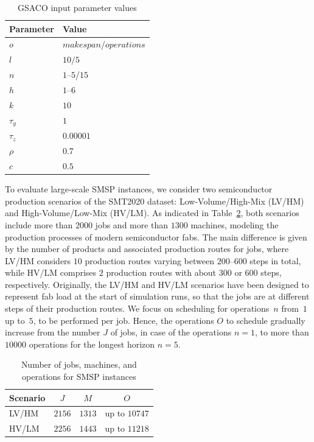 \begin{table}[t]
	\caption{GSACO input parameter values}\label{tab:p_value} \centering
	\begin{tabular}{|l|l|}
		\hline
		Parameter & Value \\ \hline
		$o$ & $makespan$/$operations$        \\
		$l$ & $10/5$        \\
		$n$ & $1$--$5$/$15$ \\
		$h$ & $1$--$6$ \\
		$k$ & $10$ \\
		$\tau_{y}$ & $1$ \\
		$\tau_{z}$ & $0.00001$ \\
		$\rho$ & $0.7$ \\
		$c$ & $0.5$ \\
		\hline
	\end{tabular}
\end{table}

To evaluate large-scale SMSP instances,
we consider two semiconductor production scenarios of the SMT2020 dataset:
Low-Volume/High-Mix (LV/HM) and High-Volume/Low-Mix (HV/LM).
As indicated in Table~\ref{tab:Dataset},
both scenarios include more than $2000$ jobs and more than $1300$ machines,
modeling the production processes of modern semiconductor fabs.
The main difference is given by the number of products and associated production routes for jobs, where LV/HM considers $10$ production routes varying between
$200$--$600$ steps in total, while HV/LM comprises $2$ production routes with about
$300$ or $600$ steps, respectively.
Originally, the LV/HM and HV/LM scenarios have been designed to represent fab load at the
start of simulation runs, so that the jobs are at different steps of their
production routes.
We focus on scheduling for operations~$n$ from~$1$ up to~$5$,
to be performed per job.
Hence, the operations $O$ to schedule gradually increase from the
number $J$ of jobs, in case of the operations $n=1$,
to more than $10000$ operations %
for the longest %
horizon $n=5$.

\begin{table}[t]
	\caption{Number of jobs, machines, and operations for SMSP instances}\label{tab:Dataset} \centering
	\begin{tabular}{|l|c|c|c|}
		\hline
		Scenario & $J$    & $M$    & $O$              \\ \hline
		LV/HM    & $2156$ & $1313$ & up to $10747$    \\ 
		HV/LM    & $2256$ & $1443$ & up to $11218$    \\
		\hline
	\end{tabular}
\end{table}
%

